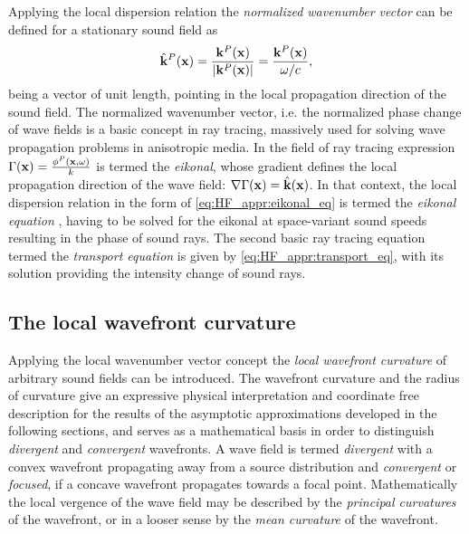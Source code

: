 Applying the local dispersion relation the \emph{normalized wavenumber vector} can be defined for a stationary sound field as
\begin{equation}
\hat{\mathbf{k}}^P(\mathbf{x}) = \frac{\mathbf{k}^P(\mathbf{x})}{|\mathbf{k}^P(\mathbf{x})|} = \frac{\mathbf{k}^P(\mathbf{x})}{\omega/c},
\end{equation}
being a vector of unit length, pointing in the local propagation direction of the sound field.
%
The normalized wavenumber vector, i.e. the normalized phase change of wave fields is a basic concept in ray tracing, massively used for solving wave propagation problems in anisotropic media.
In the field of ray tracing expression $\Gamma(\mathbf{x}) = \frac{\phi^P(\mathbf{x},\omega)}{k}$ is termed the \emph{eikonal}, whose gradient defines the local propagation direction of the wave field: $\nabla \Gamma(\mathbf{x}) = \hat{\mathbf{k}}(\mathbf{x})$.
In that context, the local dispersion relation in the form of \eqref{eq:HF_appr:eikonal_eq} is termed the \emph{eikonal equation} \cite{Kinsler2000, Pierce1991}, having to be solved for the eikonal at space-variant sound speeds resulting in the phase of sound rays.
The second basic ray tracing equation termed the \emph{transport equation} is given by \eqref{eq:HF_appr:transport_eq}, with its solution providing the intensity change of sound rays.

\subsection{The local wavefront curvature}
%
Applying the local wavenumber vector concept the \emph{local wavefront curvature} of arbitrary sound fields can be introduced.
The wavefront curvature and the radius of curvature give an expressive physical interpretation and coordinate free description for the results of the asymptotic approximations developed in the following sections, and serves as a mathematical basis in order to distinguish \emph{divergent} and \emph{convergent} wavefronts.
A wave field is termed \emph{divergent} with a convex wavefront propagating away from a source distribution and \emph{convergent} or \emph{focused}, if a concave wavefront propagates towards a focal point.
Mathematically the local vergence of the wave field may be described by the \emph{principal curvatures} of the wavefront, or in a looser sense by the \emph{mean curvature} of the wavefront.

